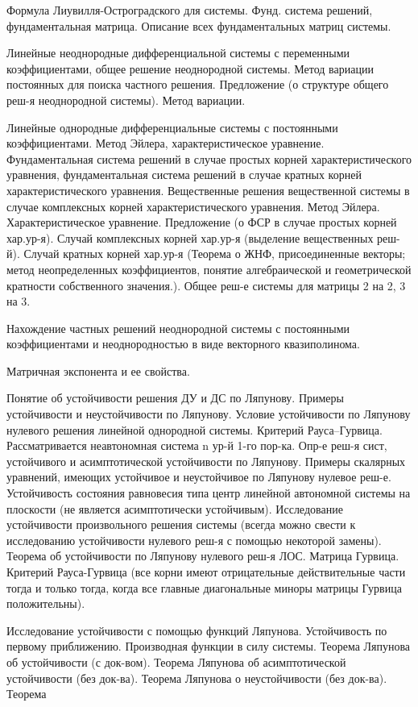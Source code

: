 \documentclass{article}
\newcounter{ticket}[subsection]
\newcounter{Ticket}[subsection]
\newcommand{\Ticket}[1][]{\item[Билет \ifthenelse{\equal{#1}{}}{}{\setcounter{ticket}{#1}}\theticket\refstepcounter{ticket}:]}
\begin{document}
\begin{description}
	Формула Лиувилля-Остроградского для системы. Фунд. система решений, фундаментальная матрица.
	Описание всех фундаментальных матриц системы.
	\Ticket Линейные неоднородные дифференциальной системы с переменными коэффициентами, общее
	решение неоднородной системы. Метод вариации постоянных для поиска частного решения.
	Предложение (о структуре общего реш-я неоднородной системы). Метод вариации.
	\Ticket Линейные однородные дифференциальные системы с постоянными коэффициентами. Метод
	Эйлера, характеристическое уравнение. Фундаментальная система решений в случае простых корней
	характеристического уравнения, фундаментальная система решений в случае кратных корней
	характеристического уравнения. Вещественные решения вещественной системы в случае
	комплексных корней характеристического уравнения.
	Метод Эйлера. Характеристическое уравнение. Предложение (о ФСР в случае простых корней хар.ур-я).
	Случай комплексных корней хар.ур-я (выделение вещественных реш-й). Случай кратных корней хар.ур-я
	(Теорема о ЖНФ, присоединенные векторы; метод неопределенных коэффициентов, понятие
	алгебраической и геометрической кратности собственного значения.). Общее реш-е системы для матрицы 2
	на 2, 3 на 3.
	\Ticket Нахождение частных решений неоднородной системы с постоянными коэффициентами и
	неоднородностью в виде векторного квазиполинома.
	\Ticket Матричная экспонента и ее свойства.
	\Ticket Понятие об устойчивости решения ДУ и ДС по Ляпунову. Примеры устойчивости и
	неустойчивости по Ляпунову. Условие устойчивости по Ляпунову нулевого решения линейной
	однородной системы. Критерий Рауса–Гурвица.
	Рассматривается неавтономная система n ур-й 1-го пор-ка. Опр-е реш-я сист, устойчивого и
	асимптотической устойчивости по Ляпунову. Примеры скалярных уравнений, имеющих устойчивое и
	неустойчивое по Ляпунову нулевое реш-е. Устойчивость состояния равновесия типа центр линейной
	автономной системы на плоскости (не является асимптотически устойчивым). Исследование устойчивости
	произвольного решения системы (всегда можно свести к исследованию устойчивости нулевого реш-я с
	помощью некоторой замены). Теорема об устойчивости по Ляпунову нулевого реш-я ЛОС. Матрица
	Гурвица. Критерий Рауса-Гурвица (все корни имеют отрицательные действительные части тогда и только
	тогда, когда все главные диагональные миноры матрицы Гурвица положительны).
	\Ticket Исследование устойчивости с помощью функций Ляпунова. Устойчивость по первому
	приближению.
	Производная функции в силу системы. Теорема Ляпунова об устойчивости (с док-вом). Теорема Ляпунова
	об асимптотической устойчивости (без док-ва). Теорема Ляпунова о неустойчивости (без док-ва). Теорема

\end{description}
\end{document}
